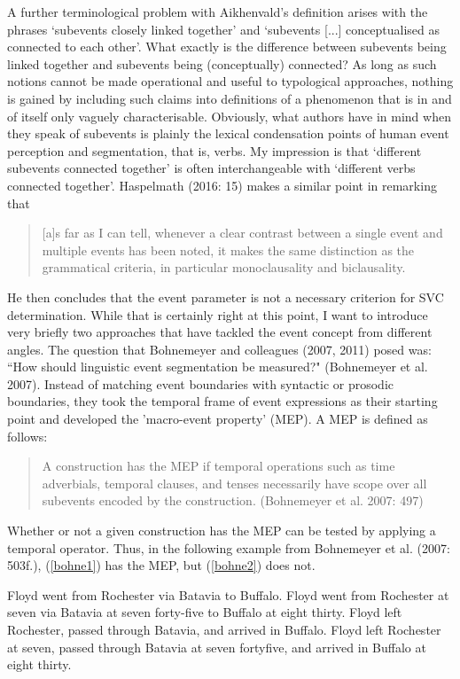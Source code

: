 A further terminological problem with Aikhenvald's definition arises with the phrases `subevents closely linked together' and `subevents [...] conceptualised as connected to each other'. What exactly is the difference between subevents being linked together and subevents being (conceptually) connected? As long as such notions cannot be made operational and useful to typological approaches, nothing is gained by including such claims into definitions of a phenomenon that is in and of itself only vaguely characterisable. Obviously, what authors have in mind when they speak of subevents is plainly the lexical condensation points of human event perception and segmentation, that is, verbs. My impression is that `different subevents connected together' is often interchangeable with `different verbs connected together'. Haspelmath (2016: 15) makes a similar point in remarking that

\begin{quote}[a]s far
as I can tell, whenever a clear contrast between a single event and multiple events has
been noted, it makes the same distinction as the grammatical criteria, in particular
monoclausality and biclausality.\end{quote}

He then concludes that the event parameter is not a necessary criterion for SVC determination. While that is certainly right at this point, I want to introduce very briefly two approaches that have tackled the event concept from different angles. The question that Bohnemeyer and colleagues (2007, 2011) posed was: ``How should linguistic event segmentation be measured?" (Bohnemeyer et al. 2007). Instead of matching event boundaries with syntactic or prosodic boundaries, they took the temporal frame of event expressions as their starting point and developed the 'macro-event property' (MEP). A MEP is defined as follows:

\begin{quote}A construction has the MEP if temporal operations such as time adverbials,
temporal clauses, and tenses necessarily have scope over all subevents encoded by
the construction. (Bohnemeyer et al. 2007: 497)\end{quote}

Whether or not a given construction has the MEP can be tested by applying a temporal operator. Thus, in the following example from Bohnemeyer et al. (2007: 503f.), (\ref{bohne1}) has the MEP, but (\ref{bohne2}) does not.

\pex 
\ea
\ea
\label{bohne1} Floyd went from Rochester via Batavia to Buffalo.
\ex *Floyd went from Rochester at seven via Batavia at seven forty-five to
Buffalo at eight thirty.
\ex \label{bohne2} Floyd left Rochester, passed through Batavia, and arrived in Buffalo.
\ex Floyd left Rochester at seven, passed through Batavia at seven fortyfive,
and arrived in Buffalo at eight thirty.
\z
\z

